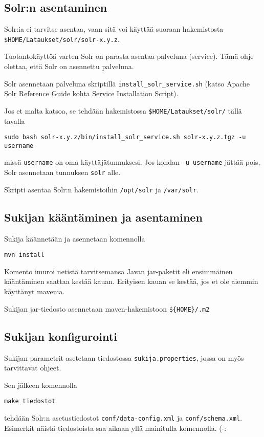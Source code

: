 \documentclass[12pt]{article}
\begin{document}
\subsection*{Solr:n asentaminen}

Solr:ia ei tarvitse asentaa, vaan sitä voi käyttää suoraan
hakemistosta \verb=$HOME/Lataukset/solr/solr-x.y.z=.

Tuotantokäyttöä varten Solr on parasta asentaa palveluna (service).
Tämä ohje olettaa, että Solr on asennettu palveluna.

Solr asennetaan palveluna skriptillä
\verb=install_solr_service.sh= 
(katso Apache Solr Reference Guide
kohta Service Installation Script).

Jos et malta katsoa, se tehdään hakemistossa
\verb=$HOME/Lataukset/solr/= tällä tavalla

{\footnotesize
\verb=sudo bash solr-x.y.z/bin/install_solr_service.sh solr-x.y.z.tgz -u username=
}

missä \verb=username= on oma käyttäjätunnuksesi.
Jos kohdan \verb=-u username= jättää pois, Solr asennetaan tunnuksen
\verb=solr= alle.

Skripti asentaa Solr:n hakemistoihin \verb=/opt/solr= ja
\verb=/var/solr=.


\subsection*{Sukijan kääntäminen ja asentaminen}

Sukija käännetään ja asennetaan komennolla

\verb=mvn install=

Komento imuroi netistä tarvitsemansa Javan jar-paketit eli ensimmäinen
kääntäminen saattaa kestää kauan. Erityisen kauan se kestää, jos et
ole aiemmin käyttänyt mavenia.

Sukijan jar-tiedosto asennetaan maven-hakemistoon \verb|${HOME}/.m2|


\subsection*{Sukijan konfigurointi}

Sukijan parametrit asetetaan tiedostossa \verb|sukija.properties|,
jossa on myös tarvittavat ohjeet.

Sen jälkeen komennolla

\verb|make tiedostot|

tehdään Solr:n asetustiedostot \verb=conf/data-config.xml= ja
\verb=conf/schema.xml=. Esimerkit näistä tiedostoista
saa aikaan yllä mainitulla komennolla. (-:
\end{document}
